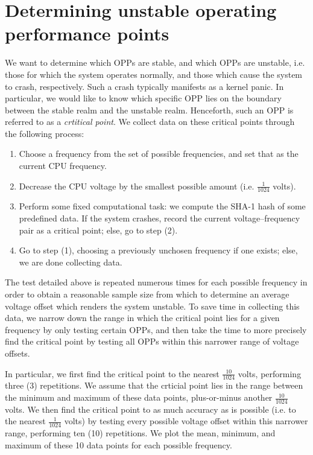 \section{Determining unstable operating performance points}
\label{sec:unstableOPPs}

We want to determine which OPPs are stable, and which OPPs are unstable, i.e.
those for which the system operates normally, and those which cause the system
to crash, respectively. Such a crash typically manifests as a kernel panic.
In particular, we would like to know which specific OPP lies on the boundary
between the stable realm and the unstable realm. Henceforth, such an OPP is
referred to as a \emph{crtitical point}. We collect data on these critical
points through the following process:
\begin{enumerate}
    \item Choose a frequency from the set of possible frequencies, and set that
        as the current CPU frequency.
    \item Decrease the CPU voltage by the smallest possible amount
        (i.e. $\frac{1}{1024}$ volts).
    \item Perform some fixed computational task: we compute the SHA-1 hash of
        some predefined data. If the system crashes, record the current
        voltage–frequency pair as a critical point; else, go to step (2).
    \item Go to step (1), choosing a previously unchosen frequency if one
        exists; else, we are done collecting data.
\end{enumerate}

The test detailed above is repeated numerous times for each possible frequency
in order to obtain a reasonable sample size from which to determine an average
voltage offset which renders the system unstable. To save time in collecting
this data, we narrow down the range in which the critical point lies for a
given frequency by only testing certain OPPs, and then take the time to more
precisely find the critical point by testing all OPPs within this narrower
range of voltage offsets.

In particular, we first find the critical point to the nearest $\frac{10}{1024}$
volts, performing three (3) repetitions. We assume that the crticial point lies
in the range between the minimum and maximum of these data points, plus-or-minus
another $\frac{10}{1024}$ volts. We then find the critical point to as much
accuracy as is possible (i.e. to the nearest $\frac{1}{1024}$ volts) by testing
every possible voltage offset within this narrower range, performing ten (10)
repetitions. We plot the mean, minimum, and maximum of these 10 data points for
each possible frequency.

